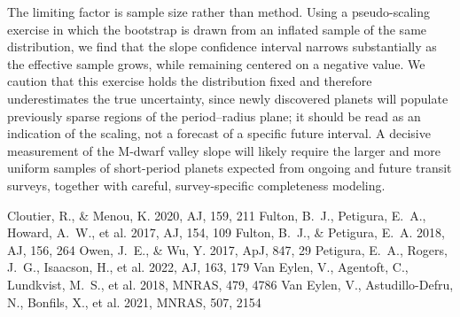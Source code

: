 \documentclass[twocolumn]{aastex701}
\begin{document}
The limiting factor is sample size rather than method. Using a pseudo-scaling
exercise in which the bootstrap is drawn from an inflated sample of the same
distribution, we find that the slope confidence interval narrows substantially
as the effective sample grows, while remaining centered on a negative value.
We caution that this exercise holds the distribution fixed and therefore
underestimates the true uncertainty, since newly discovered planets will
populate previously sparse regions of the period--radius plane; it should be
read as an indication of the scaling, not a forecast of a specific future
interval. A decisive measurement of the M-dwarf valley slope will likely
require the larger and more uniform samples of short-period planets expected
from ongoing and future transit surveys, together with careful,
survey-specific completeness modeling.

\begin{thebibliography}{}
 Cloutier, R., \& Menou, K.
  2020, AJ, 159, 211
 Fulton, B.~J., Petigura, E.~A.,
  Howard, A.~W., et al. 2017, AJ, 154, 109
 Fulton, B.~J., \&
  Petigura, E.~A. 2018, AJ, 156, 264
 Owen, J.~E., \& Wu, Y. 2017, ApJ,
  847, 29
 Petigura, E.~A., Rogers, J.~G.,
  Isaacson, H., et al. 2022, AJ, 163, 179
 Van Eylen, V., Agentoft, C.,
  Lundkvist, M.~S., et al. 2018, MNRAS, 479, 4786
 Van Eylen, V., Astudillo-Defru,
  N., Bonfils, X., et al. 2021, MNRAS, 507, 2154
\end{thebibliography}
\end{document}

